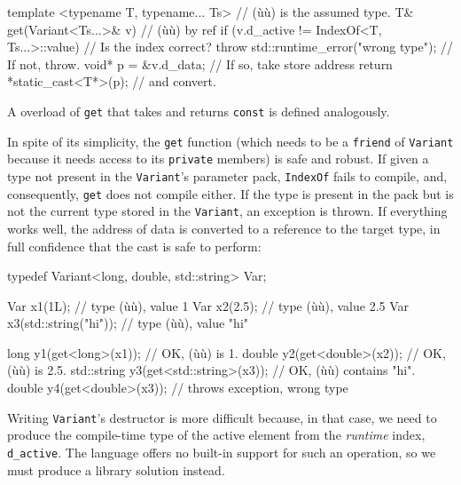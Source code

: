 \begin{emcppslisting}[emcppsbatch={e38,e39}]
template <typename T, typename... Ts>            // (ù{}ù) is the assumed type.
T& get(Variant<Ts...>& v)                        // (ù{}ù) by ref
{
    if (v.d_active != IndexOf<T, Ts...>::value)  // Is the index correct?
        throw std::runtime_error("wrong type");  // If not, throw.
    void* p = &v.d_data;                         // If so, take store address
    return *static_cast<T*>(p);                  // and convert.
}
\end{emcppslisting}
    

\noindent A overload of \lstinline!get! that takes and returns \lstinline!const! is
defined analogously.

In spite of its simplicity, the \lstinline!get! function (which needs to be
a \lstinline!friend! of \lstinline!Variant! because it needs access to its
\lstinline!private! members) is safe and robust. If given a type not
present in the \lstinline!Variant!'s parameter pack, \lstinline!IndexOf! fails
to compile, and, consequently, \lstinline!get! does not compile either. If
the type is present in the pack but is not the current type stored in
the \lstinline!Variant!, an exception is thrown. If everything works well,
the address of data is converted to a reference to the target type, in
full confidence that the cast is safe to perform:

\begin{emcppslisting}[emcppsbatch={e38,e39}]
typedef Variant<long, double, std::string> Var;

Var x1(1L);                            // type (ù{}ù), value 1
Var x2(2.5);                           // type (ù{}ù), value 2.5
Var x3(std::string("hi"));             // type (ù{}ù), value "hi"

long y1(get<long>(x1));                // OK, (ù{}ù) is 1.
double y2(get<double>(x2));            // OK, (ù{}ù) is 2.5.
std::string y3(get<std::string>(x3));  // OK, (ù{}ù) contains "hi".
double y4(get<double>(x3));            // throws exception, wrong type
\end{emcppslisting}
    

\noindent Writing \lstinline!Variant!'s destructor is more difficult because, in that
case, we need to produce the compile-time type of the active element
from the \emph{runtime} index, \lstinline!d_active!. The language offers
no built-in support for such an operation, so we must produce a library
solution instead.

